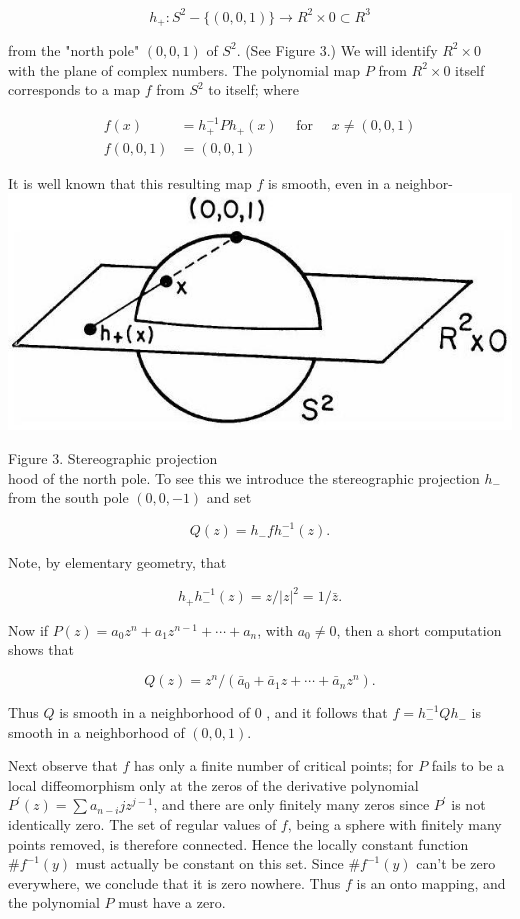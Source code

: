 \documentclass[10pt, letterpaper]{article}
\begin{document}
$$
h_{+}: S^{2}-\{(0,0,1)\} \rightarrow R^{2} \times 0 \subset R^{3}
$$

from the "north pole" $(0,0,1)$ of $S^{2}$. (See Figure 3.) We will identify $R^{2} \times 0$ with the plane of complex numbers. The polynomial map $P$ from $R^{2} \times 0$ itself corresponds to a map $f$ from $S^{2}$ to itself; where

$$
\begin{aligned}
f(x) & =h_{+}^{-1} P h_{+}(x) \quad \text { for } \quad x \neq(0,0,1) \\
f(0,0,1) & =(0,0,1)
\end{aligned}
$$

It is well known that this resulting map $f$ is smooth, even in a neighbor-\\
\includegraphics[scale=0.2, center]{2025_05_28_7c9927389b272ddbc2c3g-20}

Figure 3. Stereographic projection\\
hood of the north pole. To see this we introduce the stereographic projection $h_{-}$from the south pole $(0,0,-1)$ and set

$$
Q(z)=h_{-} f h_{-}^{-1}(z) .
$$

Note, by elementary geometry, that

$$
h_{+} h_{-}^{-1}(z)=z /|z|^{2}=1 / \bar{z} .
$$

Now if $P(z)=a_{0} z^{n}+a_{1} z^{n-1}+\cdots+a_{n}$, with $a_{0} \neq 0$, then a short computation shows that

$$
Q(z)=z^{n} /\left(\bar{a}_{0}+\bar{a}_{1} z+\cdots+\bar{a}_{n} z^{n}\right) .
$$

Thus $Q$ is smooth in a neighborhood of 0 , and it follows that $f=h_{-}^{-1} Q h_{-}$ is smooth in a neighborhood of $(0,0,1)$.

Next observe that $f$ has only a finite number of critical points; for $P$ fails to be a local diffeomorphism only at the zeros of the derivative polynomial $P^{\prime}(z)=\sum a_{n-i} j z^{j-1}$, and there are only finitely many zeros since $P^{\prime}$ is not identically zero. The set of regular values of $f$, being a sphere with finitely many points removed, is therefore connected. Hence the locally constant function $\# f^{-1}(y)$ must actually be constant on this set. Since $\# f^{-1}(y)$ can't be zero everywhere, we conclude that it is zero nowhere. Thus $f$ is an onto mapping, and the polynomial $P$ must have a zero.
\end{document}
